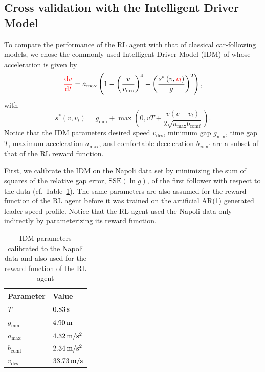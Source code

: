 \documentclass[review]{elsarticle}
\providecommand{\red}[1]{\textcolor{red}{#1}}
\providecommand{\martin}[1]{\red{#1}} %
\providecommand{\sub}[1]{_{\mathrm{#1}}}  %
\providecommand{\3}{{\ss}}
\begin{document}
\subsection{Cross validation with the Intelligent Driver Model}
\label{sec:crossValIDM}
To compare the performance of the RL agent with that of
classical car-following models, we chose the commonly used
Intelligent-Driver Model (IDM) of \cite{Opus} whose acceleration is given
by 
\begin{equation}
\label{eq:IDM}
\martin{\dv{v}{t}}=a\sub{max}\left(1-\left(\frac{v}{v\sub{des}}\right)^{4}-\left(\frac{s^{*}\left(v, \martin{v_l}\right)}{g}\right)^{2}\right),
\end{equation}
with
\begin{equation}
\label{eq:IDMsstar}
s^{*}\left(v, v_l\right)=g\sub{min}+\max \left(0,vT+\frac{v(v-v_l)}{2 \sqrt{a\sub{max} b\sub{comf}}}\right).
\end{equation}
Notice that the IDM parameters desired
speed $v\sub{des}$, minimum gap $g\sub{min}$, time gap $T$, maximum
acceleration $a\sub{max}$, and
comfortable deceleration $b\sub{comf}$ are a subset of that of the RL reward
function. 

First, we calibrate the IDM on the Napoli data set by
minimizing the sum of squares of the relative gap error,
$\mathrm{SSE}(\ln g)$, of the first follower with respect to the
data (cf. Table~\ref{tab:IDMparameters}). The same parameters are also
assumed for the reward function of the RL agent before it was trained
on the artificial AR(1) generated leader speed profile. Notice that the RL agent used the Napoli data only
indirectly by parameterizing its reward function.

\begin{table}
	\caption{IDM parameters calibrated to the Napoli
            data and also used for the reward function of the RL agent}
	\label{tab:IDMparameters} 
	\begin{center}
		\begin{tabular}{ p{} |p{}  } 
		Parameter & Value   \\ \hline
			$T$ & $\unit[0.83]{s}$\\
			$g\sub{min}$ & $\unit[4.90]{m}$\\
			$a\sub{max}$ & $\unit[4.32]{m/s^2}$\\
			$b\sub{comf}$ & $\unit[2.34]{ m/s^2}$\\
			$v\sub{des}$ & $\unit[33.73]{m/s}$
			
		\end{tabular}
	\end{center}
\end{table}
\end{document}
